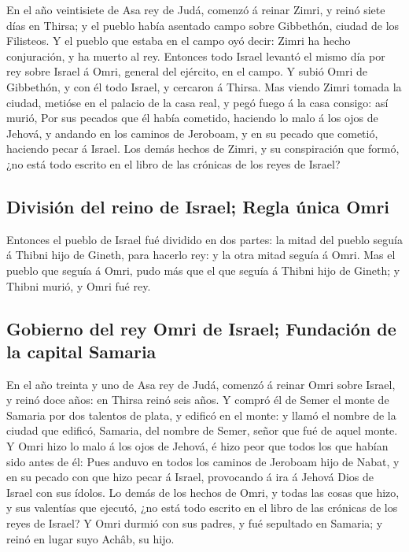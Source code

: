  En el año veintisiete de Asa rey de Judá, comenzó á reinar
Zimri, y reinó siete días en Thirsa; y el pueblo había asentado campo
sobre Gibbethón, ciudad de los Filisteos.  Y el pueblo que
estaba en el campo oyó decir: Zimri ha hecho conjuración, y ha muerto al
rey. Entonces todo Israel levantó el mismo día por rey sobre Israel á
Omri, general del ejército, en el campo.  Y subió Omri de
Gibbethón, y con él todo Israel, y cercaron á Thirsa.  Mas
viendo Zimri tomada la ciudad, metióse en el palacio de la casa real, y
pegó fuego á la casa consigo: así murió,  Por sus pecados
que él había cometido, haciendo lo malo á los ojos de Jehová, y andando
en los caminos de Jeroboam, y en su pecado que cometió, haciendo pecar á
Israel.  Los demás hechos de Zimri, y su conspiración que
formó, ¿no está todo escrito en el libro de las crónicas de los reyes de
Israel?

\hypertarget{divisiuxf3n-del-reino-de-israel-regla-uxfanica-omri}{%
\subsection{División del reino de Israel; Regla única
Omri}\label{divisiuxf3n-del-reino-de-israel-regla-uxfanica-omri}}

 Entonces el pueblo de Israel fué dividido en dos partes:
la mitad del pueblo seguía á Thibni hijo de Gineth, para hacerlo rey: y
la otra mitad seguía á Omri.  Mas el pueblo que seguía á
Omri, pudo más que el que seguía á Thibni hijo de Gineth; y Thibni
murió, y Omri fué rey.

\hypertarget{gobierno-del-rey-omri-de-israel-fundaciuxf3n-de-la-capital-samaria}{%
\subsection{Gobierno del rey Omri de Israel; Fundación de la capital
Samaria}\label{gobierno-del-rey-omri-de-israel-fundaciuxf3n-de-la-capital-samaria}}

 En el año treinta y uno de Asa rey de Judá, comenzó á
reinar Omri sobre Israel, y reinó doce años: en Thirsa reinó seis años.
 Y compró él de Semer el monte de Samaria por dos talentos
de plata, y edificó en el monte: y llamó el nombre de la ciudad que
edificó, Samaria, del nombre de Semer, señor que fué de aquel monte.
 Y Omri hizo lo malo á los ojos de Jehová, é hizo peor que
todos los que habían sido antes de él:  Pues anduvo en
todos los caminos de Jeroboam hijo de Nabat, y en su pecado con que hizo
pecar á Israel, provocando á ira á Jehová Dios de Israel con sus ídolos.
 Lo demás de los hechos de Omri, y todas las cosas que
hizo, y sus valentías que ejecutó, ¿no está todo escrito en el libro de
las crónicas de los reyes de Israel?  Y Omri durmió con sus
padres, y fué sepultado en Samaria; y reinó en lugar suyo Achâb, su
hijo.

